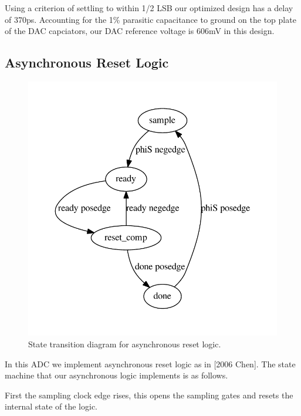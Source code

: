 \documentclass[10pt,journal]{IEEEtran}\usepackage{longtable}
\begin{document}
Using a criterion of settling to within 1/2 LSB our optimized design has a delay of 370ps.
Accounting for the 1\% parasitic capacitance to ground on the top plate of the DAC capciators, our DAC reference voltage is 606mV in this design. 




\subsection{Asynchronous Reset Logic}

\begin{figure}[tbph]
\begin{center}
\includegraphics[width=1\columnwidth]{async.pdf}
\caption{State transition diagram for asynchronous reset logic.}
\label{fig:AsyncStateMachine}
\end{center}
\end{figure}


In this ADC we implement asynchronous reset logic as in [2006 Chen]. The state machine that our asynchronous logic implements is as follows.

First the sampling clock edge rises, this opens the sampling gates and resets the internal state of the logic.
\end{document}
